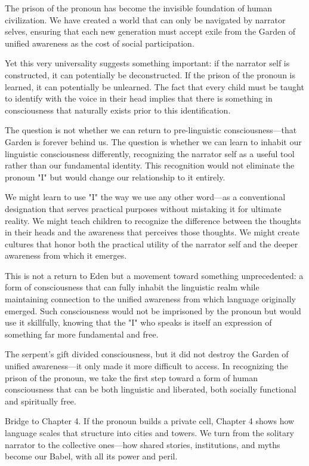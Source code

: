 The prison of the pronoun has become the invisible foundation of human civilization. We have created a world that can only be navigated by narrator selves, ensuring that each new generation must accept exile from the Garden of unified awareness as the cost of social participation.

Yet this very universality suggests something important: if the narrator self is constructed, it can potentially be deconstructed. If the prison of the pronoun is learned, it can potentially be unlearned. The fact that every child must be taught to identify with the voice in their head implies that there is something in consciousness that naturally exists prior to this identification.

The question is not whether we can return to pre-linguistic consciousness—that Garden is forever behind us. The question is whether we can learn to inhabit our linguistic consciousness differently, recognizing the narrator self as a useful tool rather than our fundamental identity. This recognition would not eliminate the pronoun "I" but would change our relationship to it entirely.

We might learn to use "I" the way we use any other word—as a conventional designation that serves practical purposes without mistaking it for ultimate reality. We might teach children to recognize the difference between the thoughts in their heads and the awareness that perceives those thoughts. We might create cultures that honor both the practical utility of the narrator self and the deeper awareness from which it emerges.

This is not a return to Eden but a movement toward something unprecedented: a form of consciousness that can fully inhabit the linguistic realm while maintaining connection to the unified awareness from which language originally emerged. Such consciousness would not be imprisoned by the pronoun but would use it skillfully, knowing that the "I" who speaks is itself an expression of something far more fundamental and free.

The serpent's gift divided consciousness, but it did not destroy the Garden of unified awareness—it only made it more difficult to access. In recognizing the prison of the pronoun, we take the first step toward a form of human consciousness that can be both linguistic and liberated, both socially functional and spiritually free.

\bigskip
\noindent Bridge to Chapter 4. If the pronoun builds a private cell, Chapter 4 shows how language scales that structure into cities and towers. We turn from the solitary narrator to the collective ones—how shared stories, institutions, and myths become our Babel, with all its power and peril.
